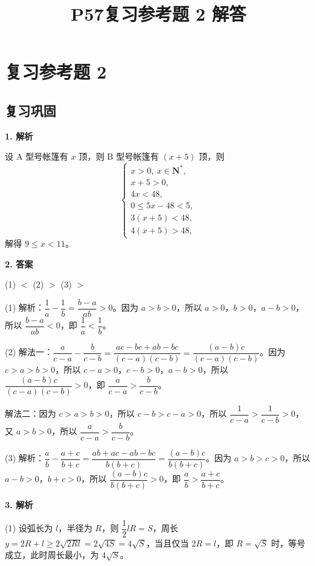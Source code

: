 \documentclass[11pt,a4paper]{article}
\title{\bfseries P57复习参考题 2 解答}
\author{}
\date{}
\begin{document}
	
	\maketitle
	
	
	
	\section*{复习参考题 2}
	
	\subsection*{复习巩固}
	
	\noindent\textbf{1. 解析}
	
	设 A 型号帐篷有 $x$ 顶，则 B 型号帐篷有 $(x+5)$ 顶，则
	\[
	\begin{cases}
		x>0,\ x\in \mathbf{N}^*,\\
		x+5>0,\\
		4x<48,\\
		0\leq 5x-48<5,\\
		3(x+5)<48,\\
		4(x+5)>48,
	\end{cases}
	\]
	解得 $9\leq x<11$。
	
	\noindent\textbf{2. 答案}
	
	(1) $<$ \quad (2) $>$ \quad (3) $>$
	
	(1) 解析：$\dfrac{1}{a}-\dfrac{1}{b}=\dfrac{b-a}{ab}>0$。因为 $a>b>0$，所以 $a>0$，$b>0$，$a-b>0$，所以 $\dfrac{b-a}{ab}<0$，即 $\dfrac{1}{a}<\dfrac{1}{b}$。
	
	(2) 解法一：$\dfrac{a}{c-a}-\dfrac{b}{c-b}=\dfrac{ac-bc+ab-bc}{(c-a)(c-b)}=\dfrac{(a-b)c}{(c-a)(c-b)}$。因为 $c>a>b>0$，所以 $c-a>0$，$c-b>0$，$a-b>0$，所以 $\dfrac{(a-b)c}{(c-a)(c-b)}>0$，即 $\dfrac{a}{c-a}>\dfrac{b}{c-b}$。
	
	解法二：因为 $c>a>b>0$，所以 $c-b>c-a>0$，所以 $\dfrac{1}{c-a}>\dfrac{1}{c-b}>0$，又 $a>b>0$，所以 $\dfrac{a}{c-a}>\dfrac{b}{c-b}$。
	
	(3) 解析：$\dfrac{a}{b}-\dfrac{a+c}{b+c}=\dfrac{ab+ac-ab-bc}{b(b+c)}=\dfrac{(a-b)c}{b(b+c)}$。因为 $a>b>c>0$，所以 $a-b>0$，$b+c>0$，所以 $\dfrac{(a-b)c}{b(b+c)}>0$，即 $\dfrac{a}{b}>\dfrac{a+c}{b+c}$。
	
	\noindent\textbf{3. 解析}
	
	(1) 设弧长为 $l$，半径为 $R$，则 $\dfrac{1}{2}lR=S$，周长 $y=2R+l\geq 2\sqrt{2Rl}=2\sqrt{4S}=4\sqrt{S}$，当且仅当 $2R=l$，即 $R=\sqrt{S}$ 时，等号成立，此时周长最小，为 $4\sqrt{S}$。
	
\end{document}
